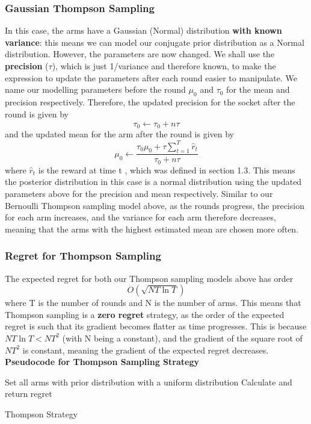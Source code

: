 \subsubsection{Gaussian Thompson Sampling}
In this case, the arms have a Gaussian (Normal) distribution \textbf{with known variance}: this means we can model our conjugate prior distribution as a Normal distribution. However, the parameters are now changed. We shall use the \textbf{precision} ($\tau$), which is just 1/variance and therefore known, to make the expression to update the parameters after each round easier to manipulate. We name our modelling parameters before the round $\mu_0$ and $\tau_0$ for the mean and precision respectively. Therefore, the updated precision for the socket after the round is given by
$$\tau_0\xleftarrow{}\tau_0 + n\tau$$
and the updated mean for the arm after the round is given by
$$\mu_0\xleftarrow{}\frac{\tau_0\mu_0 + \tau\sum_{t=1}^T\widehat{r}_t}{\tau_0 + n\tau} $$
where $\widehat{r}_t$ is the reward at time t \citep{agrawal2013further}, which was defined in section 1.3. This means the posterior distribution in this case is a normal distribution using the updated parameters above for the precision and mean respectively. Similar to our Bernoulli Thompson sampling model above, as the rounds progress, the precision for each arm increases, and the variance for each arm therefore decreases, meaning that the arms with the highest estimated mean are chosen more often.

\subsubsection{Regret for Thompson Sampling}
The expected regret for both our Thompson sampling models above has order
$$O(\sqrt{NT\ln{T}})$$
where T is the number of rounds and N is the number of arms. \citep{agrawal2013further} This means that Thompson sampling is a \textbf{zero regret} strategy, as the order of the expected regret is such that its gradient becomes flatter as time progresses. This is because $NT\ln{T} < NT^2$ (with N being a constant), and the gradient of the square root of $NT^2$ is constant, meaning the gradient of the expected regret decreases.
\newline
\textbf{Pseudocode for Thompson Sampling Strategy}
\newline
\begin{algorithm}[H]
    Set all arms with prior distribution with a uniform distribution\;
    Calculate and return regret
    \caption{Thompson Strategy}
\end{algorithm}